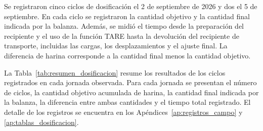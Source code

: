 
Se registraron cinco ciclos de dosificación el 2 de septiembre de 2026
y dos el 5 de septiembre. En cada ciclo se registraron la cantidad objetivo
y la cantidad final indicada por la balanza. Además, se midió el tiempo
desde la preparación del recipiente y el uso de la función TARE hasta la
devolución del recipiente de transporte, incluidas las cargas, los
desplazamientos y el ajuste final. La diferencia de harina corresponde
a la cantidad final menos la cantidad objetivo.

La Tabla~\ref{tab:resumen_dosificacion} resume los resultados de los ciclos
registrados en cada jornada observada. Para cada jornada se presentan el
número de ciclos, la cantidad objetivo acumulada de harina, la cantidad
final indicada por la balanza, la diferencia entre ambas cantidades y el
tiempo total registrado. El detalle de los registros
se encuentra en los Apéndices~\ref{ap:registros_campo} y
\ref{ap:tablas_dosificacion}.

